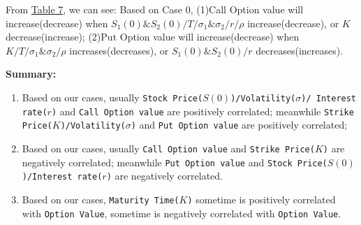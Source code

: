 \documentclass[11pt,a4paper]{article}
\begin{document}
    

    From \hyperref[T7]{Table 7}, we can see: Based on Case 0, 
    (1)Call Option value will increase(decrease) when
    $ S_1(0)\&S_2(0) /  T / \sigma_1 \& \sigma_2 / r / \rho$ 
    increase(decrease), or $ K$ decrease(increase); 
    (2)Put Option value will increase(decrease) when
    $ K / T / \sigma_1\&\sigma_2 / \rho$ increases(decreases), 
    or $ S_1(0)\&S_2(0) / r$ decreases(increases).


    \textbf{Summary:}
    \begin{enumerate}[(1)]
    \item Based on our cases, usually
    \texttt{Stock Price($S(0)$)/Volatility($\sigma$)/ 
    Interest rate($r$)}
    and \texttt{Call Option value}
    are positively correlated; meanwhile
    \texttt{Strike Price($K$)/Volatility($\sigma$)}
    and \texttt{Put Option value}
    are positively correlated;

    \item Based on our cases, usually
    \texttt{Call Option value} and 
    \texttt{Strike Price($K$)}
    are negatively correlated; meanwhile
    \texttt{Put Option value} and 
    \texttt{Stock Price($S(0)$)/Interest rate($r$)}
    are negatively correlated.

    \item Based on our cases,
    \texttt{Maturity Time($K$)} sometime is 
    positively correlated with \texttt{Option Value},
    sometime is 
    negatively correlated with \texttt{Option Value}.
    \end{enumerate}
\end{document}

